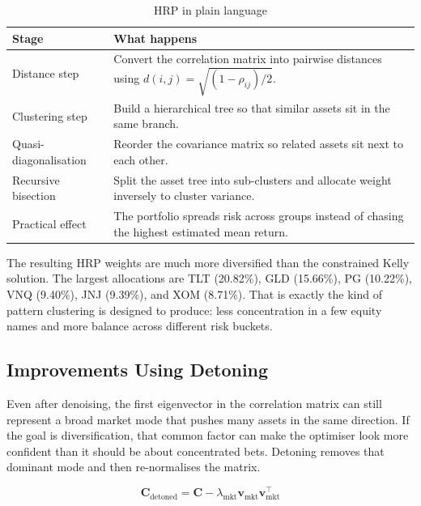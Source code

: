 \documentclass[11pt,a4paper]{article}
\begin{document}
\begin{table}[H]
\centering
\caption{HRP in plain language}
\label{tab:hrp_summary}
{\small\setlength{\tabcolsep}{4pt}\renewcommand{\arraystretch}{1.15}\begin{tabularx}{\textwidth}{>{\raggedright\arraybackslash}p{3.0cm} X}
\toprule
Stage & What happens \\
\midrule
Distance step & Convert the correlation matrix into pairwise distances using \(d(i,j)=\sqrt{(1-\rho_{ij})/2}\). \\
Clustering step & Build a hierarchical tree so that similar assets sit in the same branch. \\
Quasi-diagonalisation & Reorder the covariance matrix so related assets sit next to each other. \\
Recursive bisection & Split the asset tree into sub-clusters and allocate weight inversely to cluster variance. \\
Practical effect & The portfolio spreads risk across groups instead of chasing the highest estimated mean return. \\
\bottomrule
\end{tabularx}}
\end{table}

The resulting HRP weights are much more diversified than the constrained Kelly solution. The
largest allocations are TLT (20.82\%), GLD (15.66\%), PG (10.22\%), VNQ (9.40\%), JNJ
(9.39\%), and XOM (8.71\%). That is exactly the kind of pattern clustering is designed to
produce: less concentration in a few equity names and more balance across different risk buckets.

\subsection{Improvements Using Detoning}

Even after denoising, the first
eigenvector in the correlation matrix can still represent a broad market mode that pushes many
assets in the same direction. If the goal is diversification, that common factor can make the
optimiser look more confident than it should be about concentrated bets. Detoning removes that
dominant mode and then re-normalises the matrix.

\[
\bm{C}_{\text{detoned}} = \bm{C} - \lambda_{\text{mkt}} \bm{v}_{\text{mkt}} \bm{v}_{\text{mkt}}^\top
\]
\end{document}
